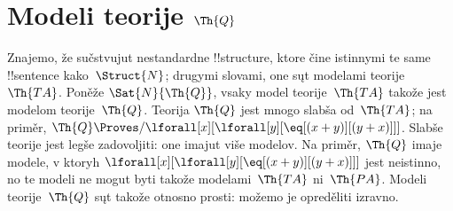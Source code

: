 \documentclass[../../../include/open-logic-section]{subfiles}
\begin{document}
\section{Modeli teorije $\Th{Q}$}

\begin{explain}
Znajemo, že sučstvujut nestandardne !!{structure}, ktore čine istinnymi
te same !!{sentence} kako~$\Struct{N}$; drugymi slovami, one sųt modelami
teorije~$\Th{TA}$. Poněže $\Sat{N}{\Th{Q}}$, vsaky model teorije~$\Th{TA}$
takože jest modelom teorije~$\Th{Q}$. Teorija $\Th{Q}$ jest mnogo slabša
od~$\Th{TA}$; na priměr,
$\Th{Q} \Proves/ \lforall[x][\lforall[y][\eq[(x +
      y)][(y+x)]]]$. Slabše teorije jest legše zadovoljiti: one imajut
više modelov. Na priměr, $\Th{Q}$ imaje modele, v ktoryh
$\lforall[x][\lforall[y][\eq[(x + y)][(y+x)]]]$ jest neistinno, no te
modeli ne mogut byti takože modelami~$\Th{TA}$ ni~$\Th{PA}$. Modeli
teorije~$\Th{Q}$ sųt takože otnosno prosti: možemo je opreděliti
izravno.
\end{explain}
\end{document}
